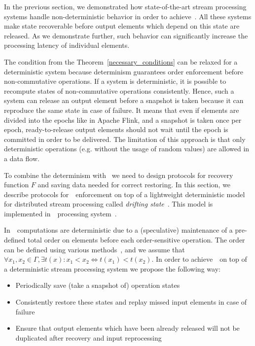 
\label {fs-consistency-section}

In the previous section, we demonstrated how state-of-the-art stream processing systems handle non-deterministic behavior in order to achieve~\eo. All these systems make state recoverable before output elements which depend on this state are released. As we demonstrate further, such behavior can significantly increase the processing latency of individual elements.

The condition from the Theorem~\ref{necessary_conditions} can be relaxed for a deterministic system because determinism guarantees order enforcement before non-commutative operations. If a system is deterministic, it is possible to recompute states of non-commutative operations consistently. Hence, such a system can release an output element before a snapshot is taken because it can reproduce the same state in case of failure. It means that even if elements are divided into the epochs like in Apache Flink, and a snapshot is taken once per epoch, ready-to-release output elements should not wait until the epoch is committed in order to be delivered. The limitation of this approach is that only deterministic operations (e.g. without the usage of random values) are allowed in a data flow.

To combine the determinism with \eo\ we need to design protocols for recovery function $F$ and saving data needed for correct restoring. In this section, we describe protocols for~\eo\ enforcement on top of a lightweight deterministic model for distributed stream processing called {\em drifting state}~\cite{we2018adbis}. This model is implemented in~\FlameStream\ processing system~\cite{we2018beyondmr}.

In~\FlameStream\, computations are deterministic due to a (speculative) maintenance of a pre-defined total order on elements before each order-sensitive operation. The order can be defined using various methods~\cite{we2018seim}, and we assume that $\forall x_1,x_2\in \Gamma, \exists t(x): x_1 < x_2 \Longleftrightarrow t(x_1) < t(x_2)$. In order to achieve~\eo\ on top of a deterministic stream processing system we propose the following way:
\begin{itemize}
    \item Periodically save (take a snapshot of) operation states
    \item Consistently restore these states and replay missed input elements in case of failure
    \item Ensure that output elements which have been already released will not be duplicated after recovery and input reprocessing
\end{itemize}

